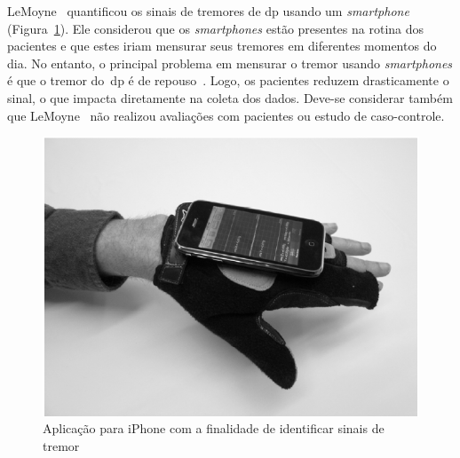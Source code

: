LeMoyne~\cite{lemoyne2010} quantificou os sinais de tremores de \ac{dp} usando um \textit{smartphone} (Figura~\ref{fig:iphone-tremor}). Ele considerou que os \textit{smartphones} estão presentes na rotina dos pacientes e que estes iriam mensurar seus tremores em diferentes momentos do dia. No entanto, o principal problema em mensurar o tremor usando \textit{smartphones} é que o tremor do~\ac{dp} é de repouso~\cite{jankovic2008}. Logo, os pacientes reduzem drasticamente o sinal, o que impacta diretamente na coleta dos dados. Deve-se considerar também que LeMoyne~\cite{lemoyne2010} não realizou avaliações com pacientes ou estudo de caso-controle. 

\begin{figure}
\centering
  \includegraphics[scale=0.3]{./img/moyne-iphone.png}
\caption[Aplicação para \textit{smartphone} com a finalidade de identificar sinais de tremor]{Aplicação para iPhone com a finalidade de identificar sinais de tremor ~\cite{lemoyne2010}}
 \label{fig:iphone-tremor}
\end{figure}








